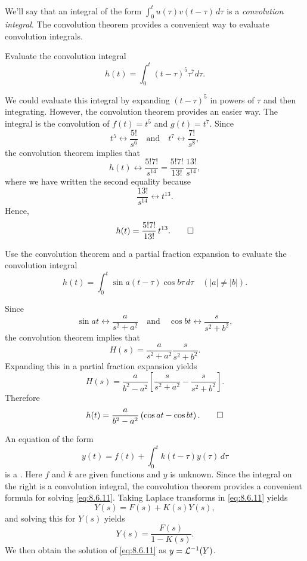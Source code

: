 
We'll say that an integral of the form $\int_0^t
u(\tau)v(t-\tau)\,d\tau$ is a
\emph{\color{blue}convolution integral}.
The convolution
theorem provides a convenient way to evaluate convolution integrals.

\begin{example}\label{example:8.6.5}
 Evaluate the convolution integral
\[
h(t)=\int_0^t(t-\tau)^5\tau^7 d\tau.
\]
\end{example}

\begin{solution}
We could evaluate this integral by expanding
$(t-\tau)^5$ in powers of $\tau$ and then integrating. However, the
convolution theorem provides an easier way. The integral is the
convolution of $f(t)=t^5$ and $g(t)=t^7$. Since
\[
t^5\leftrightarrow \frac{5!}{s^6}\quad\text{and}\quad  t^7
\leftrightarrow \frac{7!}{s^8},
\]
the convolution theorem implies that
\[
h(t)\leftrightarrow \frac{5!7!}{s^{14}}=\frac{5!7!}{13!}\,\frac{13!
}{s^{14}},
\]
where we have written the second equality because
\[
\frac{13!}{s^{14}}\leftrightarrow t^{13}.
\]
Hence,
\[
h(t)=\frac{5!7!}{13!}\, t^{13}.\qedhere
\]
\end{solution}

\begin{example}\label{example:8.6.6}
Use the convolution theorem and a partial fraction expansion to
evaluate the convolution integral
\[
h(t)=\int_0^t\sin a(t-\tau)\cos b\tau\,d\tau\quad (|a|\ne |b|).
\]
\end{example}

\begin{solution}
Since
\[
\sin at\leftrightarrow \frac{a}{s^2+a^2}\quad\text{and}\quad
\cos bt\leftrightarrow \frac{s}{s^2+b^2},
\]
 the convolution theorem implies that
\[
H(s)=\frac{a}{s^2+a^2}\frac{s}{s^2+b^2}.
\]
Expanding this in a partial fraction expansion yields
\[
H(s)=\frac{a}{b^2-a^2}\left[\frac{s}{s^2+a^2}-\frac{s}{s^2+b^2}\right].
\]
Therefore
\[
h(t)=\frac{a}{b^2-a^2}\left(\cos at-\cos bt\right).\qedhere
\]
\end{solution}



An equation of the form
\begin{equation}\label{eq:8.6.11}
y(t)=f(t)+\int_0^t k(t-\tau) y(\tau)\,d\tau
\end{equation}
is a
.
Here $f$ and $k$ are given functions and $y$ is unknown. Since the
integral on the right is a convolution integral, the convolution
theorem provides a convenient formula for solving \eqref{eq:8.6.11}.
Taking Laplace transforms in \eqref{eq:8.6.11} yields
\[
Y(s)=F(s)+K(s) Y(s),
\]
and solving this for $Y(s)$ yields
\[
Y(s)=\frac{F(s)}{1-K(s)}.
\]
We  then obtain the solution of  \eqref{eq:8.6.11} as
 $y={\mathcal L}^{-1}(Y)$.

